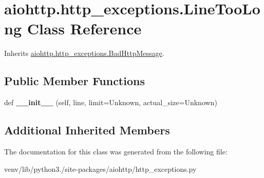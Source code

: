 \hypertarget{classaiohttp_1_1http__exceptions_1_1_line_too_long}{}\section{aiohttp.\+http\+\_\+exceptions.\+Line\+Too\+Long Class Reference}
\label{classaiohttp_1_1http__exceptions_1_1_line_too_long}


Inherits \hyperlink{classaiohttp_1_1http__exceptions_1_1_bad_http_message}{aiohttp.\+http\+\_\+exceptions.\+Bad\+Http\+Message}.

\subsection*{Public Member Functions}
\begin{DoxyCompactItemize}
\item 
\mbox{\label{classaiohttp_1_1http__exceptions_1_1_line_too_long_a4274d8d9e0baccf0085bac9ce71f2204}} 
def {\bfseries \+\_\+\+\_\+init\+\_\+\+\_\+} (self, line, limit=\textquotesingle{}Unknown\textquotesingle{}, actual\+\_\+size=\textquotesingle{}Unknown\textquotesingle{})
\end{DoxyCompactItemize}
\subsection*{Additional Inherited Members}


The documentation for this class was generated from the following file\+:\begin{DoxyCompactItemize}
\item 
venv/lib/python3./site-\/packages/aiohttp/http\+\_\+exceptions.\+py\end{DoxyCompactItemize}
